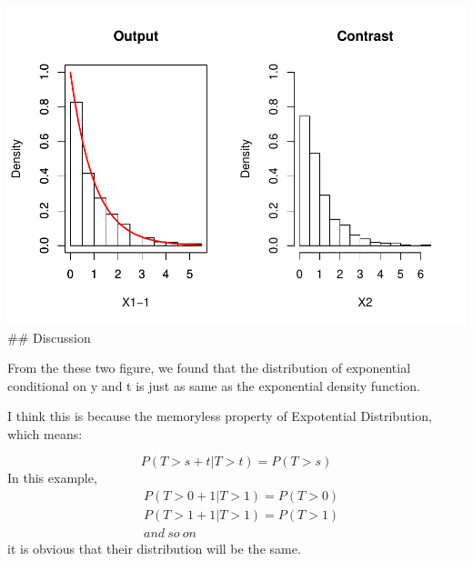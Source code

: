 \documentclass[]{article}
\newenvironment{Shaded}{\begin{snugshade}}{\end{snugshade}}
\newcommand{\KeywordTok}[1]{\textcolor[rgb]{0.13,0.29,0.53}{\textbf{#1}}}
\newcommand{\DataTypeTok}[1]{\textcolor[rgb]{0.13,0.29,0.53}{#1}}
\newcommand{\DecValTok}[1]{\textcolor[rgb]{0.00,0.00,0.81}{#1}}
\newcommand{\StringTok}[1]{\textcolor[rgb]{0.31,0.60,0.02}{#1}}
\newcommand{\OperatorTok}[1]{\textcolor[rgb]{0.81,0.36,0.00}{\textbf{#1}}}
\newcommand{\NormalTok}[1]{#1}
\begin{document}
\begin{Shaded}
\end{Shaded}

\includegraphics{Expontential_task1_files/figure-latex/unnamed-chunk-2-1.pdf}
\#\# Discussion

From the these two figure, we found that the distribution of exponential
conditional on y and t is just as same as the exponential density
function.

I think this is because the memoryless property of Expotential
Distribution, which means:

\[
P(T>s+t|T>t) = P(T>s)
\] In this example, \[\begin{split}
&P(T>0+1|T>1) = P(T>0) \\
&P(T>1+1|T>1) = P(T>1) \\
&and\ so\ on
\end{split}\] it is obvious that their distribution will be the same.
\end{document}
